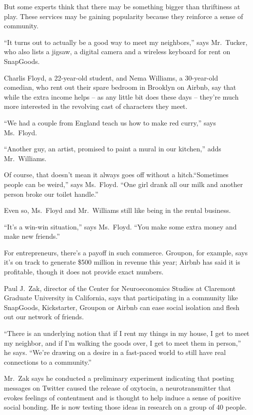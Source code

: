 ﻿\documentclass[12pt]{article}
\begin{document}
But some experts think that there may be something bigger than thriftiness at play. These services
may be gaining popularity because they reinforce a sense of community.

``It turns out to actually be a good way to meet my neighbors,'' says Mr.~Tucker, who also lists a
jigsaw, a digital camera and a wireless keyboard for rent on SnapGoods.

Charlis Floyd, a 22-year-old student, and Nema Williams, a 30-year-old comedian, who rent out their
spare bedroom in Brooklyn on Airbnb, say that while the extra income helps -- as any little bit does
these days -- they're much more interested in the revolving cast of characters they meet.

``We had a couple from England teach us how to make red curry,'' says Ms.~Floyd.

``Another guy, an artist, promised to paint a mural in our kitchen,'' adds Mr.~Williams.

Of course, that doesn't mean it always goes off without a hitch.``Sometimes people can be weird,''
says Ms.~Floyd. ``One girl drank all our milk and another person broke our toilet handle.''

Even so, Ms.~Floyd and Mr.~Williams still like being in the rental business.

``It's a win-win situation,'' says Ms.~Floyd. ``You make some extra money and make new friends.''

For entrepreneurs, there's a payoff in such commerce. Groupon, for example, says it's on track to
generate \$500 million in revenue this year; Airbnb has said it is profitable, though it does not
provide exact numbers.

Paul J.~Zak, director of the Center for Neuroeconomics Studies at Claremont Graduate University in
California, says that participating in a community like SnapGoods, Kickstarter, Groupon or Airbnb
can ease social isolation and flesh out our network of friends.

``There is an underlying notion that if I rent my things in my house, I get to meet my neighbor, and
if I'm walking the goods over, I get to meet them in person,'' he says. ``We're drawing on a desire
in a fast-paced world to still have real connections to a community.''

Mr.~Zak says he conducted a preliminary experiment indicating that posting messages on Twitter
caused the release of oxytocin, a neurotransmitter that evokes feelings of contentment and is
thought to help induce a sense of positive social bonding. He is now testing those ideas in research
on a group of 40 people.
\end{document}
